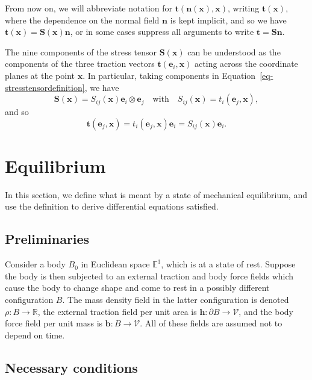 \documentclass[
  letterpaper,
  DIV=11,
  numbers=noendperiod]{scrreprt}
\theoremstyle{plain}
\theoremstyle{remark}
\begin{document}
From now on, we will abbreviate notation for
\({\boldsymbol{t}}({\boldsymbol{n}}({\boldsymbol{x}}),{\boldsymbol{x}})\),
writing \({\boldsymbol{t}}({\boldsymbol{x}})\), where the dependence on
the normal field \({\boldsymbol{n}}\) is kept implicit, and so we have
\({\boldsymbol{t}}({\boldsymbol{x}}) = {\boldsymbol{S}}({\boldsymbol{x}}){\boldsymbol{n}}\),
or in some cases suppress all arguments to write
\({\boldsymbol{t}}={\boldsymbol{S}}{\boldsymbol{n}}\).

The nine components of the stress tensor
\({\boldsymbol{S}}({\boldsymbol{x}})\) can be understood as the
components of the three traction vectors
\({\boldsymbol{t}}({\boldsymbol{e}}_i,{\boldsymbol{x}})\) acting across
the coordinate planes at the point \({\boldsymbol{x}}\). In particular,
taking components in Equation~\ref{eq-stresstensordefinition}, we have
\[{\boldsymbol{S}}({\boldsymbol{x}}) = S_{ij}({\boldsymbol{x}}){\boldsymbol{e}}_i\otimes{\boldsymbol{e}}_j\quad\text{with}\quad S_{ij}({\boldsymbol{x}}) = t_i({\boldsymbol{e}}_j,{\boldsymbol{x}}),\]
and so
\[{\boldsymbol{t}}({\boldsymbol{e}}_j,{\boldsymbol{x}}) = t_i({\boldsymbol{e}}_j,{\boldsymbol{x}}){\boldsymbol{e}}_i = S_{ij}({\boldsymbol{x}}){\boldsymbol{e}}_i.\]

\section{Equilibrium}\label{equilibrium}

In this section, we define what is meant by a state of mechanical
equilibrium, and use the definition to derive differential equations
satisfied.

\subsection{Preliminaries}\label{preliminaries-3}

Consider a body \(B_0\) in Euclidean space \({\mathbb{E}}^3\), which is
at a state of rest. Suppose the body is then subjected to an external
traction and body force fields which cause the body to change shape and
come to rest in a possibly different configuration \(B\). The mass
density field in the latter configuration is denoted
\(\rho:B\to{\mathbb{R}}\), the external traction field per unit area is
\({\boldsymbol{h}}:\partial B\to{\mathcal{V}}\), and the body force
field per unit mass is \({\boldsymbol{b}}:B\to{\mathcal{V}}\). All of
these fields are assumed not to depend on time.

\subsection{Necessary conditions}\label{necessary-conditions}
\end{document}
